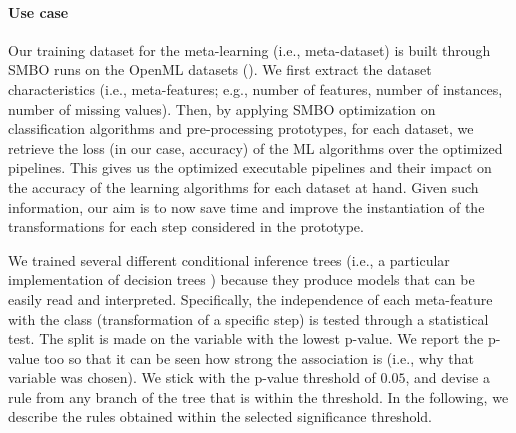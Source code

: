 \paragraph{Use case}
Our training dataset for the meta-learning (i.e., meta-dataset) is built through SMBO runs on the OpenML datasets ().
We first extract the dataset characteristics (i.e., meta-features; e.g., number of features, number of instances, number of missing values).
Then, by applying SMBO optimization on classification algorithms and pre-processing prototypes, for each dataset, we retrieve the loss (in our case, accuracy) of the ML algorithms over the optimized pipelines.
This gives us the optimized executable pipelines and their impact on the accuracy of the learning algorithms for each dataset at hand.
Given such information, our aim is to now save time and improve the instantiation of the transformations for each step considered in the prototype.

We trained several different conditional inference trees (i.e., a particular implementation of decision trees \cite{ctree}) because they produce models that can be easily read and interpreted.
Specifically, the independence of each meta-feature with the class (transformation of a specific step) is tested through a statistical test.
The split is made on the variable with the lowest p-value.
We report the p-value too so that it can be seen how strong the association is (i.e., why that variable was chosen).
We stick with the p-value threshold of $0.05$, and devise a rule from any branch of the tree that is within the threshold.
In the following, we describe the rules obtained within the selected significance threshold.

